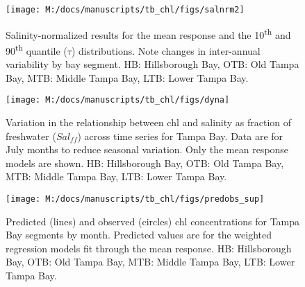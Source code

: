 \documentclass{svjour3}\usepackage[]{graphicx}\usepackage[]{color}
\newcommand{\beginsupplement}{%
        \setcounter{table}{0}
        \renewcommand{\thetable}{S\arabic{table}}%
        \setcounter{figure}{0}
        \renewcommand{\thefigure}{S\arabic{figure}}%
     }
\begin{document}
\begin{figure}[!ht]


{\centering \texttt{[image: M:/docs/manuscripts/tb\_chl/figs/salnrm2]} 

}

\caption[Salinity-normalized results for the mean response and the 10\textsuperscript{th} and 90\textsuperscript{th} quantile ($\tau$) distributions]{Salinity-normalized results for the mean response and the 10\textsuperscript{th} and 90\textsuperscript{th} quantile ($\tau$) distributions. Note changes in inter-annual variability by bay segment. HB: Hillsborough Bay, OTB: Old Tampa Bay, MTB: Middle Tampa Bay, LTB: Lower Tampa Bay.\label{fig:salnrm2}}
\end{figure}



\begin{figure}[!ht]


{\centering \texttt{[image: M:/docs/manuscripts/tb\_chl/figs/dyna]} 

}

\caption[Variation in the relationship between \ac{chl} and salinity as fraction of freshwater ($Sal_{ff}$) across time series for Tampa Bay]{Variation in the relationship between \ac{chl} and salinity as fraction of freshwater ($Sal_{ff}$) across time series for Tampa Bay. Data are for July months to reduce seasonal variation. Only the mean response models are shown. HB: Hillsborough Bay, OTB: Old Tampa Bay, MTB: Middle Tampa Bay, LTB: Lower Tampa Bay.\label{fig:dyna}}
\end{figure}



\beginsupplement
\begin{landscape}
\centering\vspace*{\fill}
\begin{figure}[!ht]


{\centering \texttt{[image: M:/docs/manuscripts/tb\_chl/figs/predobs\_sup]} 

}

\caption[Predicted (lines) and observed (circles) \ac{chl} concentrations for Tampa Bay segments by month]{Predicted (lines) and observed (circles) \ac{chl} concentrations for Tampa Bay segments by month.  Predicted values are for the weighted regression models fit through the mean response. HB: Hillsborough Bay, OTB: Old Tampa Bay, MTB: Middle Tampa Bay, LTB: Lower Tampa Bay.\label{fig:predobs_sup}}
\end{figure}


\vfill
\end{landscape}
\end{document}
